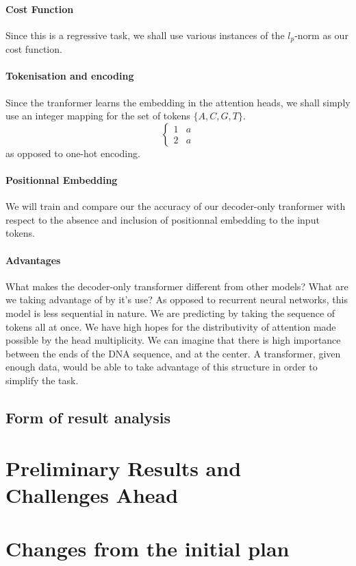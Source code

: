 \documentclass{article}
\begin{document}
\paragraph{Cost Function}
Since this is a regressive task, we shall use various instances of the 
$l_p$-norm as our cost function.

\paragraph{Tokenisation and encoding}
Since the tranformer learns the embedding in the attention heads, we
shall simply use an integer mapping for the set of tokens $\{A,C,G,T\}$.
\begin{equation}
    \begin{cases}
        1 & a \\
        2 & a 
    \end{cases}
\end{equation}
as opposed to one-hot encoding.
\paragraph{Positionnal Embedding}
We will train and compare our the accuracy of our decoder-only tranformer with 
respect to the absence and inclusion of positionnal embedding to the input tokens.

\paragraph{Advantages}
What makes the decoder-only transformer different from other models? What are
we taking advantage of by it's use? As opposed to recurrent neural networks, 
this model is less sequential in nature. We are predicting by 
taking the sequence of tokens all at once. We have high hopes for the 
distributivity of attention made possible by the head multiplicity.
We can imagine that there is high importance between the ends of the DNA 
sequence, and at the center. A transformer, given enough data, would 
be able to take advantage of this structure in order to simplify the task.


\subsection{Form of result analysis}

\section{Preliminary Results and Challenges Ahead}

\section{Changes from the initial plan}



\end{document}
